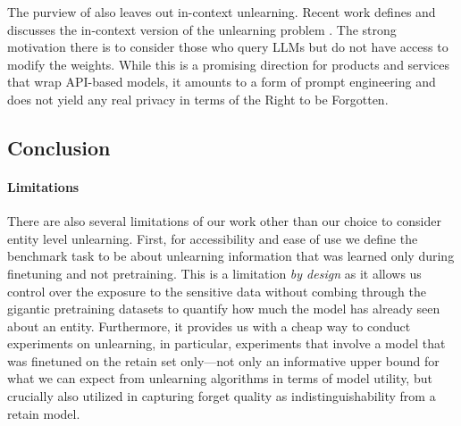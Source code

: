The purview of \tofu{} also leaves out in-context unlearning. 
Recent work defines and discusses the in-context version of the unlearning problem \citep{pawelczyk2023context}.
The strong motivation there is to consider those who query LLMs but do not have access to modify the weights.
While this is a promising direction for products and services that wrap API-based models, it amounts to a form of prompt engineering and does not yield any real privacy in terms of the Right to be Forgotten.

\subsection{Conclusion}
\label{sec:conclusion}

\paragraph{Limitations}
There are also several limitations of our work other than our choice to consider entity level unlearning.
First, for accessibility and ease of use we define the benchmark task to be about unlearning information that was learned only during finetuning and not pretraining. 
This is a limitation \emph{by design} as it allows us control over the exposure to the sensitive data without combing through the gigantic pretraining datasets to quantify how much the model has already seen about an entity. 
Furthermore, it provides us with a cheap way to conduct experiments on unlearning,
in particular, experiments that involve a model that was finetuned on the retain set only---not only an informative upper bound for what we can expect from unlearning algorithms in terms of model utility, but crucially also utilized in capturing forget quality as indistinguishability from a retain model.

